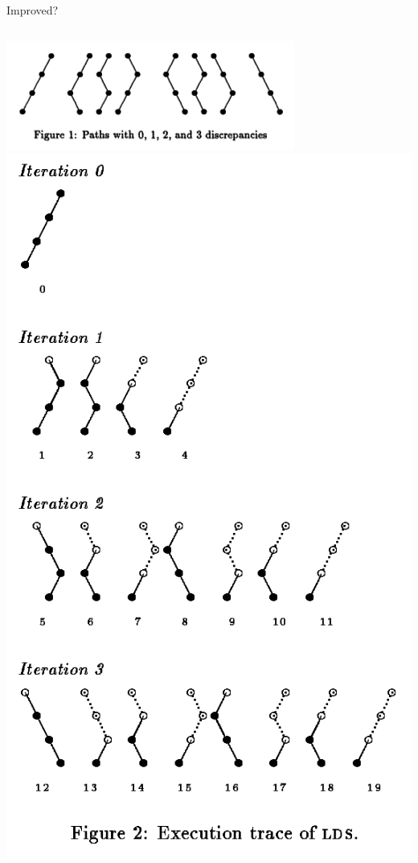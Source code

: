 \documentclass{beamer}
\begin{document}
\begin{frame}{Improved?}
    \begin{columns}
        \centering\includegraphics*[keepaspectratio=true,scale=0.4]{ilds-paths.png}
        \centering\includegraphics*[keepaspectratio=true,scale=0.18]{lds-tree.png}
    \end{columns}

\end{frame}
\end{document}
